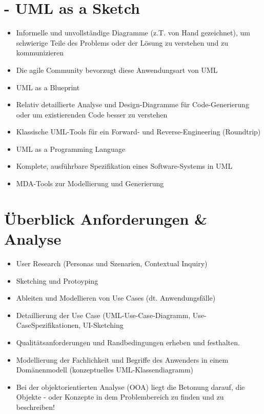 \section*{- UML as a Sketch}
\begin{itemize}
  \item Informelle und unvollständige Diagramme (z.T. von Hand gezeichnet), um schwierige Teile des Problems oder der Lösung zu verstehen und zu kommunizieren
  \item Die agile Community bevorzugt diese Anwendungsart von UML
  \item UML as a Blueprint
  \item Relativ detaillierte Analyse und Design-Diagramme für Code-Generierung oder um existierenden Code besser zu verstehen
  \item Klassische UML-Tools für ein Forward- und Reverse-Engineering (Roundtrip)
  \item UML as a Programming Language
  \item Komplete, ausführbare Spezifikation eines Software-Systems in UML
  \item MDA-Tools zur Modellierung und Generierung
\end{itemize}

\section*{Überblick Anforderungen \& Analyse}
\begin{itemize}
  \item User Research (Personas und Szenarien, Contextual Inquiry)
  \item Sketching und Protoyping
  \item Ableiten und Modellieren von Use Cases (dt. Anwendungsfälle)
  \item Detaillierung der Use Case (UML-Use-Case-Diagramm, Use-CaseSpezifikationen, UI-Sketching
  \item Qualitätsanforderungen und Randbedingungen erheben und festhalten.
  \item Modellierung der Fachlichkeit und Begriffe des Anwenders in einem Domänenmodell (konzeptuelles UML-Klassendiagramm)
  \item Bei der objektorientierten Analyse (OOA) liegt die Betonung darauf, die Objekte - oder Konzepte in dem Problembereich zu finden und zu beschreiben!
\end{itemize}

